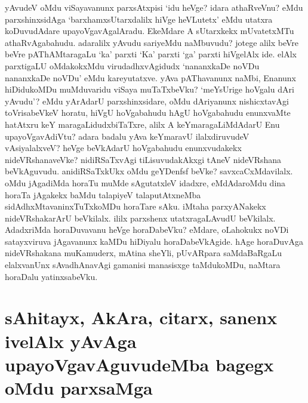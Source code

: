 yAvudeV oMdu viSayavanunx parxsAtxpisi `idu heVge? idara athaRveVnu? eMdu parxshinxsidAga `barxhamxsUtarxdalilx hiVge heVLutetx' eMdu utatxra koDuvudAdare upayoVgavAgalAradu. EkeMdare A sUtarxkekx mUvatetxMTu athaRvAgabahudu. adaralilx yAvudu sariyeMdu naMbuvudu? jotege alilx beVre beVre pAThAMtaragaLu `ka' parxti `Ka' parxti `ga' parxti hiVgelAlx ide. elAlx parxtigaLU oMdakokxMdu virudadhxvAgidudx `nananxkaDe noVDu nananxkaDe noVDu' eMdu kareyutatxve. yAva pAThavanunx naMbi, Enanunx hiDidukoMDu muMduvaridu viSaya muTaTxbeVku? `meYsUrige hoVgalu dAri yAvudu'? eMdu yArAdarU parxshinxsidare, oMdu dAriyanunx nishicxtavAgi toVrisabeVkeV horatu, hiVgU hoVgabahudu hAgU hoVgabahudu enunxvaMte hatAtxru keY maragaLidudxbiTaTxre, alilx A keYmaragaLiMdAdarU Enu upayoVgavAdiVtu? adara badalu yAva keYmaravU ilalxdiruvudeV vAsiyalalxveV? heVge beVkAdarU hoVgabahudu enunxvudakekx nideVRshanaveVke? nidiRSaTxvAgi tiLisuvudakAkxgi tAneV nideVRshana beVkAguvudu. anidiRSaTxkUkx oMdu geYDenfsf beVke? savxcaCxMdavilalx. oMdu jAgadiMda horaTu muMde sAgutatxleV idadxre, eMdAdaroMdu dina horaTa jAgakekx baMdu talapiyeV talaputAtxneMba sidAdhxMtavaninxTuTxkoMDu horaTare sAku. iMtaha parxyANakekx nideVRshakarArU beVkilalx. ililx parxshenx utatxragaLAvudU beVkilalx. AdadxriMda horaDuvavanu heVge horaDabeVku? eMdare, oLahokukx noVDi satayxviruva jAgavanunx kaMDu hiDiyalu horaDabeVkAgide. hAge horaDuvAga nideVRshakana muKamuderx, mAtina sheYli, pUvARpara saMdaBaRgaLu elalxvanUnx sAvadhAnavAgi gamanisi manasisxge taMdukoMDu, naMtara horaDalu yatinxsabeVku.

\section*{sAhitayx, AkAra, citarx, sanenx ivelAlx yAvAga upayoVgavAguvudeMba bagegx oMdu parxsaMga}

